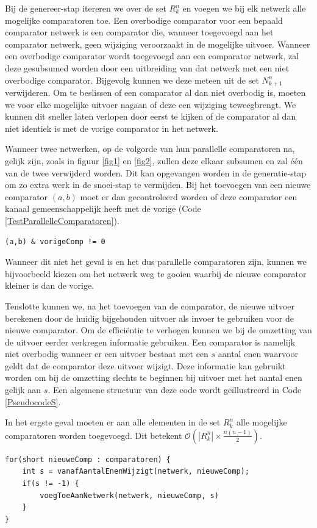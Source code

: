 \documentclass{article}
\begin{document}
Bij de genereer-stap itereren we over de set $R^n_k$ en voegen we bij elk netwerk alle mogelijke comparatoren toe.
Een overbodige comparator voor een bepaald comparator netwerk is een comparator die, wanneer toegevoegd aan het comparator netwerk, geen wijziging veroorzaakt in de mogelijke uitvoer.
Wanneer een overbodige comparator wordt toegevoegd aan een comparator netwerk, zal deze gesubsumed worden door een uitbreiding van dat netwerk met een niet overbodige comparator.
Bijgevolg kunnen we deze meteen uit de set $N^n_{k+1}$ verwijderen. 
Om te beslissen of een comparator al dan niet overbodig is, moeten we voor elke mogelijke uitvoer nagaan of deze een wijziging teweegbrengt.
We kunnen dit sneller laten verlopen door eerst te kijken of de comparator al dan niet identiek is met de vorige comparator in het netwerk.

Wanneer twee netwerken, op de volgorde van hun parallelle comparatoren na, gelijk zijn, zoals in figuur \ref{fig1} en \ref{fig2}, zullen deze elkaar subsumen en zal \'e\'en van de twee verwijderd worden.
Dit kan opgevangen worden in de generatie-stap om zo extra werk in de snoei-stap te vermijden.
Bij het toevoegen van een nieuwe comparator $(a,b)$ moet er dan gecontroleerd worden of deze comparator een kanaal gemeenschappelijk heeft met de vorige (Code \ref{TestParallelleComparatoren}).
\begin{lstlisting}[caption={Test op parallelle comparatoren.},label=TestParallelleComparatoren]
(a,b) & vorigeComp != 0
\end{lstlisting}
Wanneer dit niet het geval is en het dus parallelle comparatoren zijn, kunnen we bijvoorbeeld kiezen om het netwerk weg te gooien waarbij de nieuwe comparator kleiner is dan de vorige.

Tenslotte kunnen we, na het toevoegen van de comparator, de nieuwe uitvoer berekenen door de huidig bijgehouden uitvoer als invoer te gebruiken voor de nieuwe comparator.
Om de effici\"entie te verhogen kunnen we bij de omzetting van de uitvoer eerder verkregen informatie gebruiken.
Een comparator is namelijk niet overbodig wanneer er een uitvoer bestaat met een $s$ aantal enen waarvoor geldt dat de comparator deze uitvoer wijzigt.
Deze informatie kan gebruikt worden om bij de omzetting slechts te beginnen bij uitvoer met het aantal enen gelijk aan $s$.
Een algemene structuur van deze code wordt ge\"illustreerd in Code \ref{PseudocodeS}.

In het ergste geval moeten er aan alle elementen in de set $R^n_k$ alle mogelijke comparatoren worden toegevoegd.
Dit betekent $\mathcal{O}\left(|R^n_k|\times \frac{n(n-1)}{2} \right)$.
\begin{lstlisting}[caption={Pseudocode - optimalisatie via $s$}, label=PseudocodeS]
for(short nieuweComp : comparatoren) {
	int s = vanafAantalEnenWijzigt(netwerk, nieuweComp);
	if(s != -1) {
		voegToeAanNetwerk(netwerk, nieuweComp, s)
	}
}
\end{lstlisting}
\end{document}

